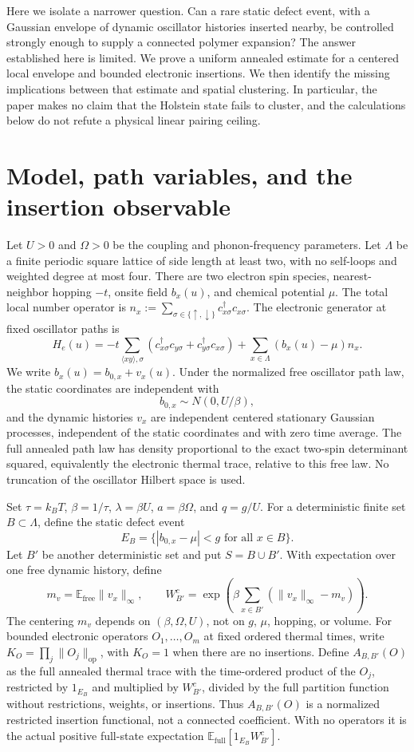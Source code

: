 \documentclass[11pt]{article}
\theoremstyle{remark}
\newcommand{\E}{\mathbb{E}}
\newcommand{\free}{\mathrm{free}}
\newcommand{\full}{\mathrm{full}}
\begin{document}
Here we isolate a narrower question. Can a rare static defect event, with a Gaussian envelope of dynamic oscillator histories inserted nearby, be controlled strongly enough to supply a connected polymer expansion? The answer established here is limited. We prove a uniform annealed estimate for a centered local envelope and bounded electronic insertions. We then identify the missing implications between that estimate and spatial clustering. In particular, the paper makes no claim that the Holstein state fails to cluster, and the calculations below do not refute a physical linear pairing ceiling.

\section{Model, path variables, and the insertion observable}

Let $U>0$ and $\Omega>0$ be the coupling and phonon-frequency parameters. Let $\Lambda$ be a finite periodic square lattice of side length at least two, with no self-loops and weighted degree at most four. There are two electron spin species, nearest-neighbor hopping $-t$, onsite field $b_x(u)$, and chemical potential $\mu$. The total local number operator is $n_x:=\sum_{\sigma\in\{\uparrow,\downarrow\}}c^\dagger_{x\sigma}c_{x\sigma}$. The electronic generator at fixed oscillator paths is
\[
 H_e(u)=-t\sum_{\langle xy\rangle,\sigma}
 (c^\dagger_{x\sigma}c_{y\sigma}+c^\dagger_{y\sigma}c_{x\sigma})
 +\sum_{x\in\Lambda}(b_x(u)-\mu)n_x.
\]
We write $b_x(u)=b_{0,x}+v_x(u)$. Under the normalized free oscillator path law, the static coordinates are independent with
\[
 b_{0,x}\sim N(0,U/\beta),
\]
and the dynamic histories $v_x$ are independent centered stationary Gaussian processes, independent of the static coordinates and with zero time average. The full annealed path law has density proportional to the exact two-spin determinant squared, equivalently the electronic thermal trace, relative to this free law. No truncation of the oscillator Hilbert space is used.

Set $\tau=k_BT$, $\beta=1/\tau$, $\lambda=\beta U$, $a=\beta\Omega$, and $q=g/U$. For a deterministic finite set $B\subset\Lambda$, define the static defect event
\[
 E_B=\{|b_{0,x}-\mu|<g\text{ for all }x\in B\}.
\]
Let $B'$ be another deterministic set and put $S=B\cup B'$. With expectation over one free dynamic history, define
\[
 m_v=\E_{\free}\|v_x\|_\infty,\qquad
 W^c_{B'}=\exp\!\left(\beta\sum_{x\in B'}(\|v_x\|_\infty-m_v)\right).
\]
The centering $m_v$ depends on $(\beta,\Omega,U)$, not on $g$, $\mu$, hopping, or volume. For bounded electronic operators $O_1,\ldots,O_m$ at fixed ordered thermal times, write $K_O=\prod_j\|O_j\|_{\mathrm{op}}$, with $K_O=1$ when there are no insertions. Define $A_{B,B'}(O)$ as the full annealed thermal trace with the time-ordered product of the $O_j$, restricted by $1_{E_B}$ and multiplied by $W^c_{B'}$, divided by the full partition function without restrictions, weights, or insertions. Thus $A_{B,B'}(O)$ is a normalized restricted insertion functional, not a connected coefficient. With no operators it is the actual positive full-state expectation $\E_{\full}[1_{E_B}W^c_{B'}]$.
\end{document}

